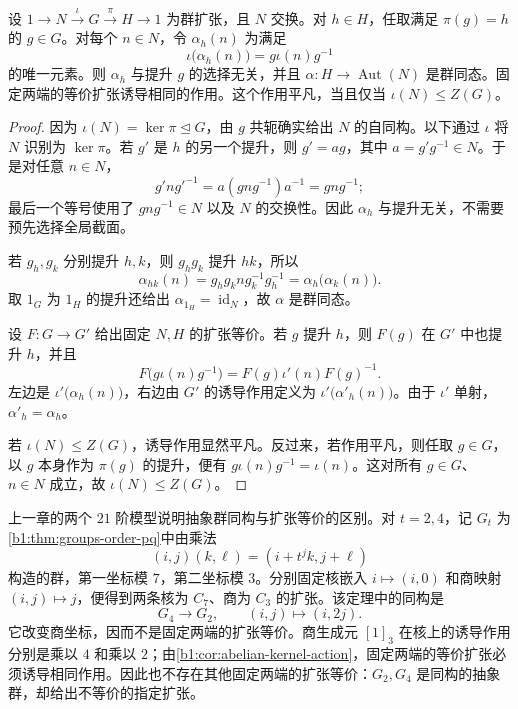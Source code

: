 \begin{corollary}[交换核上的诱导作用]\label{b1:cor:abelian-kernel-action}
	设 \(1\rightarrow N\xrightarrow{\iota}G\xrightarrow{\pi}H\rightarrow1\) 为群扩张，且 \(N\) 交换。对 \(h\in H\)，任取满足 \(\pi(g)=h\) 的 \(g\in G\)。对每个 \(n\in N\)，令 \(\alpha_h(n)\) 为满足
	\[
		\iota\bigl(\alpha_h(n)\bigr)=g\iota(n)g^{-1}
	\]
	的唯一元素。则 \(\alpha_h\) 与提升 \(g\) 的选择无关，并且 \(\alpha:H\rightarrow\operatorname{Aut}(N)\) 是群同态。固定两端的等价扩张诱导相同的作用。这个作用平凡，当且仅当 \(\iota(N)\leq Z(G)\)。
\end{corollary}
\begin{proof}
	因为 \(\iota(N)=\ker\pi\trianglelefteq G\)，由 \(g\) 共轭确实给出 \(N\) 的自同构。以下通过 \(\iota\) 将 \(N\) 识别为 \(\ker\pi\)。若 \(g'\) 是 \(h\) 的另一个提升，则 \(g'=ag\)，其中 \(a=g'g^{-1}\in N\)。于是对任意 \(n\in N\)，
	\[
		g'ng'^{-1}=a(gng^{-1})a^{-1}=gng^{-1};
	\]
	最后一个等号使用了 \(gng^{-1}\in N\) 以及 \(N\) 的交换性。因此 \(\alpha_h\) 与提升无关，不需要预先选择全局截面。

	若 \(g_h,g_k\) 分别提升 \(h,k\)，则 \(g_hg_k\) 提升 \(hk\)，所以
	\[
		\alpha_{hk}(n) =g_hg_kng_k^{-1}g_h^{-1} =\alpha_h\bigl(\alpha_k(n)\bigr).
	\]
	取 \(1_G\) 为 \(1_H\) 的提升还给出 \(\alpha_{1_H}=\operatorname{id}_N\)，故 \(\alpha\) 是群同态。

	设 \(F:G\rightarrow G'\) 给出固定 \(N,H\) 的扩张等价。若 \(g\) 提升 \(h\)，则 \(F(g)\) 在 \(G'\) 中也提升 \(h\)，并且
	\[
		F\bigl(g\iota(n)g^{-1}\bigr) =F(g)\iota'(n)F(g)^{-1}.
	\]
	左边是 \(\iota'\bigl(\alpha_h(n)\bigr)\)，右边由 \(G'\) 的诱导作用定义为 \(\iota'\bigl(\alpha'_h(n)\bigr)\)。由于 \(\iota'\) 单射，\(\alpha'_h=\alpha_h\)。

	若 \(\iota(N)\leq Z(G)\)，诱导作用显然平凡。反过来，若作用平凡，则任取 \(g\in G\)，以 \(g\) 本身作为 \(\pi(g)\) 的提升，便有 \(g\iota(n)g^{-1}=\iota(n)\)。这对所有 \(g\in G\)、\(n\in N\) 成立，故 \(\iota(N)\leq Z(G)\)。
\end{proof}

上一章的两个 \(21\) 阶模型说明抽象群同构与扩张等价的区别。对 \(t=2,4\)，记 \(G_t\) 为\cref{b1:thm:groups-order-pq}中由乘法
\[
	(i,j)(k,\ell)=(i+t^jk,j+\ell)
\]
构造的群，第一坐标模 \(7\)，第二坐标模 \(3\)。分别固定核嵌入 \(i\mapsto(i,0)\) 和商映射 \((i,j)\mapsto j\)，便得到两条核为 \(C_7\)、商为 \(C_3\) 的扩张。该定理中的同构是
\[
	G_4\longrightarrow G_2,\qquad(i,j)\longmapsto(i,2j).
\]
它改变商坐标，因而不是固定两端的扩张等价。商生成元 \([1]_3\) 在核上的诱导作用分别是乘以 \(4\) 和乘以 \(2\)；由\cref{b1:cor:abelian-kernel-action}，固定两端的等价扩张必须诱导相同作用。因此也不存在其他固定两端的扩张等价：\(G_2,G_4\) 是同构的抽象群，却给出不等价的指定扩张。


